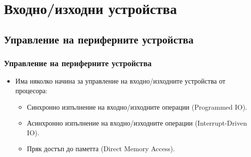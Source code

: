 \documentclass[ignorenonframetext, hyperref=unicode]{beamer}
\begin{document}
\section{Входно/изходни устройства}

\subsection{Управление на периферните устройства}

\begin{frame}
\frametitle{Управление на периферните устройства}
\begin{itemize}
\item Има няколко начина за управление на входно/изходните устройства от
процесора:
\begin{itemize}
  \item Синхронно изпълнение на входно/изходните операции (Programmed IO).
  \item Асинхронно изпълнение на входно/изходните операции (Interrupt-Driven IO).
  \item Пряк достъп до паметта (Direct Memory Access).
\end{itemize}
\end{itemize}
\end{frame}
\end{document}
